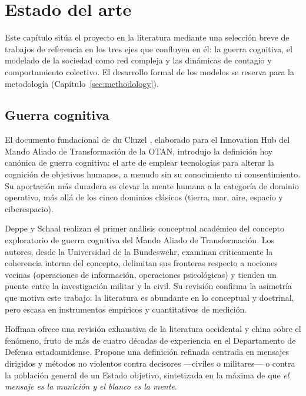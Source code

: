 \documentclass[12pt]{extarticle}
\numberwithin{equation}{section}
\begin{document}
\newpage

\section{Estado del arte}\label{sec:related}

Este cap\'itulo sit\'ua el proyecto en la literatura mediante una selecci\'on breve de trabajos de referencia en los tres ejes que confluyen en \'el: la guerra cognitiva, el modelado de la sociedad como red compleja y las din\'amicas de contagio y comportamiento colectivo. El desarrollo formal de los modelos se reserva para la metodolog\'ia (Cap\'itulo~\ref{sec:methodology}).

\subsection{Guerra cognitiva}

El documento fundacional de du Cluzel \cite{DuCluzel2021}, elaborado para el Innovation Hub del Mando Aliado de Transformaci\'on de la OTAN, introdujo la definici\'on hoy can\'onica de guerra cognitiva: el arte de emplear tecnolog\'ias para alterar la cognici\'on de objetivos humanos, a menudo sin su conocimiento ni consentimiento. Su aportaci\'on m\'as duradera es elevar la mente humana a la categor\'ia de dominio operativo, m\'as all\'a de los cinco dominios cl\'asicos (tierra, mar, aire, espacio y ciberespacio).

Deppe y Schaal \cite{DeppeSchaal2024} realizan el primer an\'alisis conceptual acad\'emico del concepto exploratorio de guerra cognitiva del Mando Aliado de Transformaci\'on. Los autores, desde la Universidad de la Bundeswehr, examinan cr\'iticamente la coherencia interna del concepto, delimitan sus fronteras respecto a nociones vecinas (operaciones de informaci\'on, operaciones psicol\'ogicas) y tienden un puente entre la investigaci\'on militar y la civil. Su revisi\'on confirma la asimetr\'ia que motiva este trabajo: la literatura es abundante en lo conceptual y doctrinal, pero escasa en instrumentos emp\'iricos y cuantitativos de medici\'on.

Hoffman \cite{Hoffman2025} ofrece una revisi\'on exhaustiva de la literatura occidental y china sobre el fen\'omeno, fruto de m\'as de cuatro d\'ecadas de experiencia en el Departamento de Defensa estadounidense. Propone una definici\'on refinada centrada en mensajes dirigidos y m\'etodos no violentos contra decisores —civiles o militares— o contra la poblaci\'on general de un Estado objetivo, sintetizada en la m\'axima de que \emph{el mensaje es la munici\'on y el blanco es la mente}. 
\end{document}
